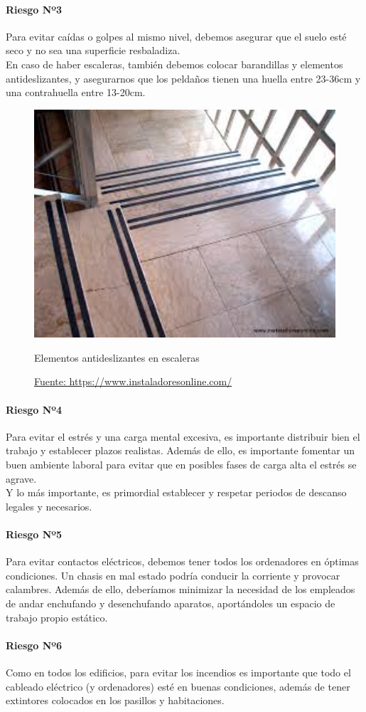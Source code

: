 \paragraph*{Riesgo Nº3}
Para evitar caídas o golpes al mismo nivel, debemos asegurar que el suelo esté seco y
no sea una superficie resbaladiza. \\
En caso de haber escaleras, también debemos colocar barandillas y elementos antideslizantes, y asegurarnos que los peldaños tienen una
huella entre 23-36cm y una contrahuella entre 13-20cm.
\begin{figure}[H]
    \centering
    \includegraphics[width=1.0\textwidth]{Fol/elemAntides.jpg}
    \caption{Elementos antideslizantes en escaleras}
    \caption*{\href{http://www.instaladoresonline.com/cintas_antideslizantes_safety_walk.html}{Fuente: https://www.instaladoresonline.com/}}
\end{figure}
\paragraph*{Riesgo Nº4}
Para evitar el estrés y una carga mental excesiva, es importante distribuir bien el trabajo 
y establecer plazos realistas. Además de ello, es importante fomentar un buen ambiente laboral para
evitar que en posibles fases de carga alta el estrés se agrave. \\ 
Y lo más importante, es primordial establecer y respetar periodos de descanso legales y necesarios. 
\paragraph*{Riesgo Nº5}
Para evitar contactos eléctricos, debemos tener todos los ordenadores en óptimas
condiciones. Un chasis en mal estado podría conducir la corriente y provocar
calambres. Además de ello, deberíamos minimizar la necesidad de los empleados de
andar enchufando y desenchufando aparatos, aportándoles un espacio de trabajo
propio estático.
\paragraph*{Riesgo Nº6}
Como en todos los edificios, para evitar los incendios es importante que todo el
cableado eléctrico (y ordenadores) esté en buenas condiciones, además de tener
extintores colocados en los pasillos y habitaciones.
